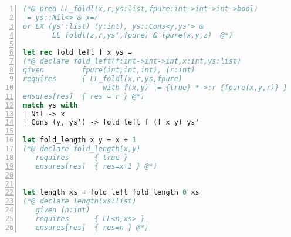 \begin{lstlisting}[language=Caml, mathescape=true, xleftmargin=2em, aboveskip=1em, xrightmargin=1em, numbers=left, frame = {TB}, title=Use inductive predicates to specify functions on variant types]
(*@ pred LL_foldl(x,r,ys:list,fpure:int->int->int->bool)
|= ys::Nil<> & x=r
or EX (ys':list) (y:int), ys::Cons<y,ys'> & 
       LL_foldl(z,r,ys',fpure) & fpure(x,y,z)  @*)

let rec fold_left f x ys = 
(*@ declare fold_left(f:int->int->int,x:int,ys:list)
given         fpure(int,int,int), (r:int)
requires      { LL_foldl(x,r,ys,fpure) 
                   with f(x,y) |= {true} *->:r {fpure(x,y,r)} }
ensures[res]  { res = r } @*)
match ys with
| Nil -> x
| Cons (y, ys') -> fold_left f (f x y) ys'

let fold_length x y = x + 1
(*@ declare fold_length(x,y)
   requires      { true }
   ensures[res]  { res=x+1 } @*)


let length xs = fold_left fold_length 0 xs
(*@ declare length(xs:list)
   given (n:int)
   requires      { LL<n,xs> }
   ensures[res]  { res=n } @*)
\end{lstlisting}




